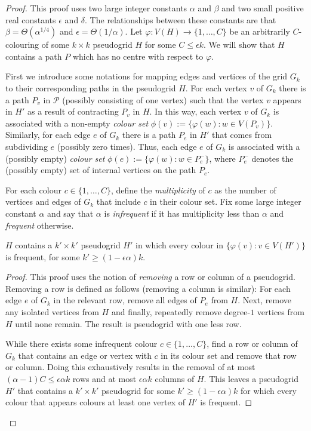 \documentclass{patmorin}
\begin{document}
\begin{proof}
  This proof uses two large integer constants $\alpha$ and $\beta$ and two small positive real constants $\epsilon$ and $\delta$.  The relationships between these constants are that $\beta = \Theta(\alpha^{1/4})$ and $\epsilon=\Theta(1/\alpha)$.  Let $\varphi:V(H)\to\{1,\ldots,C\}$ be an arbitrarily $C$-colouring of some $k\times k$ pseudogrid $H$ for some $C\le \epsilon k$.  We will show that $H$ contains a path $P$ which has no centre with respect to $\varphi$.

  First we introduce some notations for mapping edges and vertices of the grid $G_k$ to their corresponding paths in the pseudogrid $H$.  For each vertex $v$ of $G_k$ there is a path $P_v$ in $\mathcal{P}$ (possibly consisting of one vertex) such that the vertex $v$ appears in $H'$ as a result of contracting $P_v$ in $H$.  In this way, each vertex $v$ of $G_k$ is associated with a non-empty \emph{colour set} $\phi(v):=\{\varphi(w):w\in V(P_v)\}$.  Similarly, for each edge $e$ of $G_k$ there is a path $P_e$ in $H'$ that comes from subdividing $e$ (possibly zero times).  Thus, each edge $e$ of $G_k$ is associated with a (possibly empty) \emph{colour set} $\phi(e):=\{\varphi(w):w\in P^-_e\}$, where $P^-_e$ denotes the (possibly empty) set of internal vertices on the path $P_e$.

  For each colour $c\in\{1,\ldots,C\}$, define the \emph{multiplicity} of $c$ as the number of vertices and edges of $G_k$ that include $c$ in their colour set.  Fix some large integer constant $\alpha$ and say that $\alpha$ is \emph{infrequent} if it has multiplicity less than $\alpha$ and \emph{frequent} otherwise.

  \begin{clm}\label{all_frequent}
    $H$ contains a $k'\times k'$ pseudogrid $H'$ in which every colour in $\{\varphi(v):v\in V(H')\}$ is frequent, for some $k'\ge (1-\epsilon \alpha)k$.
  \end{clm}

  \begin{proof}
    This proof uses the notion of \emph{removing} a row or column of a pseudogrid.  Removing a row is defined as follows (removing a column is similar): For each edge $e$ of $G_k$ in the relevant row, remove all edges of $P_e$ from $H$. Next, remove any isolated vertices from $H$ and finally, repeatedly remove degree-$1$ vertices from $H$ until none remain.  The result is pseudogrid with one less row.

    While there exists some infrequent colour $c\in\{1,\ldots,C\}$, find a row or column of $G_k$ that contains an edge or vertex with $c$ in its colour set and remove that row or column.  Doing this exhaustively results in the removal of at most $(\alpha-1) C \le \epsilon\alpha k$ rows and at most $\epsilon\alpha k$ columns of $H$.  This leaves a pseudogrid $H'$ that contains a $k'\times k'$ pseudogrid for some $k'\ge (1-\epsilon \alpha)k$ for which every colour that appears colours at least one vertex of $H'$ is frequent.
  \end{proof}


\end{proof}
\end{document}

